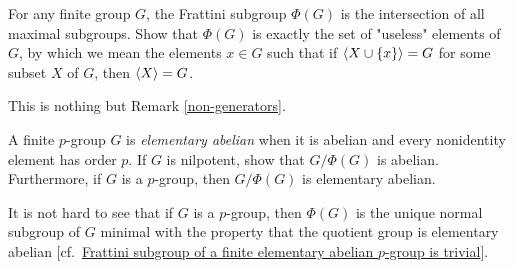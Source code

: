 \begin{probl}
    For any finite group $G$, the Frattini subgroup $\Phi(G)$ is the intersection of all maximal subgroups. Show that\/ $\Phi(G)$ is exactly the set of "useless" elements of\/ $G$, by which we mean the elements\/ $x \in G$ such that if\/ $\langle X \cup\{x\}\rangle = G$ for some subset\/ $X$ of\/ $G$, then $\langle X\rangle = G$.
\end{probl}

\begin{solution} This is nothing but Remark \ref{non-generators}.  \end{solution}

\begin{probl}\label{problem-1.D.8}
    A finite $p$-group\/ $G$ is \textsl{elementary abelian} when it is abelian and every nonidentity element has order\/ $p$. If\/ $G$ is nilpotent, show that $G/\Phi(G)$ is abelian. Furthermore, if\/ $G$ is a $p$-group, then\/ $G/\Phi(G)$ is elementary abelian.

    \textrm{ It is not hard to see that if $G$ is a $p$-group, then $\Phi(G)$ is the unique normal subgroup of $G$ minimal with the property that the quotient group is elementary abelian [cf.~\href{https://math.stackexchange.com/q/1577150/269050}{Frattini subgroup of a finite elementary abelian $p$-group is trivial}].}
\end{probl}

